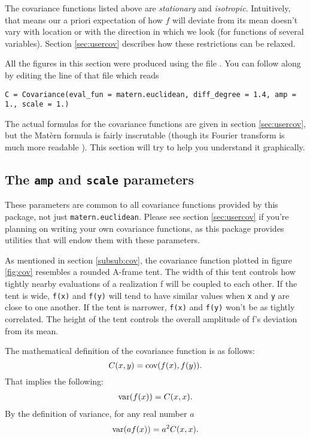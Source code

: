 \documentclass[]{manual}
\begin{document}
The covariance functions listed above are \emph{stationary} and \emph{isotropic}. Intuitively, that means our a priori expectation of how $f$ will deviate from its mean doesn't vary with location or with the direction in which we look (for functions of several variables). Section \ref{sec:usercov} describes how these restrictions can be relaxed.

All the figures in this section were produced using the file . You can follow along by editing the line of that file which reads
\begin{verbatim}
C = Covariance(eval_fun = matern.euclidean, diff_degree = 1.4, amp = 1., scale = 1.)
\end{verbatim}

The actual formulas for the covariance functions are given in section \ref{sec:usercov}, but the Mat\`ern formula is fairly inscrutable (though its Fourier transform is much more readable \cite{stein}). This section will try to help you understand it graphically.

\subsection*{The \texttt{amp} and \texttt{scale} parameters}\label{sub:ampscale}

These parameters are common to all covariance functions provided by this package, not just \texttt{matern.euclidean}. Please see section \ref{sec:usercov} if you're planning on writing your own covariance functions, as this package provides utilities that will endow them with these parameters.

As mentioned in section \ref{subsub:cov}, the covariance function plotted in figure \ref{fig:cov} resembles a rounded A-frame tent. The width of this tent controls how tightly nearby evaluations of a realization f will be coupled to each other. If the tent is wide, \texttt{f(x)} and \texttt{f(y)} will tend to have similar values when \texttt{x} and \texttt{y} are close to one another. If the tent is narrower, \texttt{f(x)} and \texttt{f(y)} won't be as tightly correlated. The height of the tent controls the overall amplitude of f's deviation from its mean.

The mathematical definition of the covariance function is as follows:
\begin{equation}
    \label{covdef} 
    C(x,y)=\textup{cov}(f(x), f(y)).
\end{equation}
That implies the following:
\begin{eqnarray*}
    \textup{var}(f(x))=C(x,x).
\end{eqnarray*}
By the definition of variance, for any real number $a$
\begin{eqnarray*}
    \textup{var}( a f(x))=a^2 C(x,x).
\end{eqnarray*}
\end{document}
